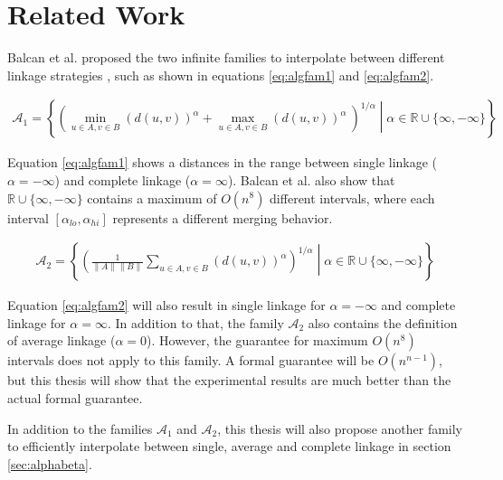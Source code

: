 \chapter{Related Work}

Balcan et al. proposed the two infinite families to interpolate between different linkage strategies \cite{DBLP:journals/corr/BalcanNVW16}, such as shown in equations \ref{eq:algfam1} and \ref{eq:algfam2}.

\begin{equation}
    \begin{aligned}
        \mathcal{A}_1 = \left\{ \left( \min\limits_{u \in A, v \in B} (d(u,v))^\alpha +  \max\limits_{u \in A, v \in B} (d(u,v))^\alpha\ \right)^{1 / \alpha} \middle| \alpha \in \mathbb{R} \cup \{\infty, -\infty\} \right\}
    \end{aligned}
    \label{eq:algfam1}
\end{equation}

Equation \ref{eq:algfam1} shows a distances in the range between single linkage ($\alpha = -\infty$) and complete linkage ($\alpha = \infty$). Balcan et al. also show that $\mathbb{R} \cup \{\infty, -\infty\}$ contains a maximum of $O(n^8)$ different intervals, where each interval $[\alpha_{lo}, \alpha_{hi}]$ represents a different merging behavior.

\begin{equation}
    \begin{aligned}
        \mathcal{A}_2 = \left\{ \left( \frac{1}{\|A\| \|B\|} \sum\limits_{u \in A, v \in B} (d(u,v))^\alpha \right)^{1 / \alpha} \middle| \alpha \in \mathbb{R} \cup \{\infty, -\infty\} \right\}
    \end{aligned}
    \label{eq:algfam2}
\end{equation}

Equation \ref{eq:algfam2} will also result in single linkage for $\alpha = - \infty$ and complete linkage for $\alpha = \infty$. In addition to that, the family $\mathcal{A}_2$ also contains the definition of average linkage ($\alpha = 0$). However, the guarantee for maximum $O(n^8)$ intervals does not apply to this family. A formal guarantee will be $O(n^{n-1})$, but this thesis will show that the experimental results are much better than the actual formal guarantee.

In addition to the families $\mathcal{A}_1$ and $\mathcal{A}_2$, this thesis will also propose another family to efficiently interpolate between single, average and complete linkage in section \ref{sec:alphabeta}.
